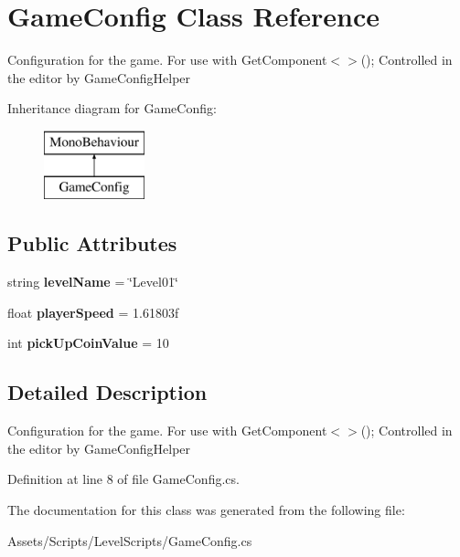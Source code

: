 \hypertarget{class_game_config}{\section{Game\+Config Class Reference}
\label{class_game_config}
}


Configuration for the game. For use with Get\+Component$<$$>$(); Controlled in the editor by Game\+Config\+Helper  


Inheritance diagram for Game\+Config\+:\begin{figure}[H]
\begin{center}
\leavevmode
\includegraphics[height=2.000000cm]{class_game_config}
\end{center}
\end{figure}
\subsection*{Public Attributes}
\begin{DoxyCompactItemize}
\item 
\hypertarget{class_game_config_a7ff8b994fa969ec37d290f5417e9f668}{string {\bfseries level\+Name} = \char`\"{}Level01\char`\"{}}\label{class_game_config_a7ff8b994fa969ec37d290f5417e9f668}

\item 
\hypertarget{class_game_config_a57453d5451afd7d19e541567385a5e24}{float {\bfseries player\+Speed} = 1.\+61803f}\label{class_game_config_a57453d5451afd7d19e541567385a5e24}

\item 
\hypertarget{class_game_config_ac61c80bdbd45f3fc7dc1a0e71bb993be}{int {\bfseries pick\+Up\+Coin\+Value} = 10}\label{class_game_config_ac61c80bdbd45f3fc7dc1a0e71bb993be}

\end{DoxyCompactItemize}


\subsection{Detailed Description}
Configuration for the game. For use with Get\+Component$<$$>$(); Controlled in the editor by Game\+Config\+Helper 



Definition at line 8 of file Game\+Config.\+cs.



The documentation for this class was generated from the following file\+:\begin{DoxyCompactItemize}
\item 
Assets/\+Scripts/\+Level\+Scripts/Game\+Config.\+cs\end{DoxyCompactItemize}
